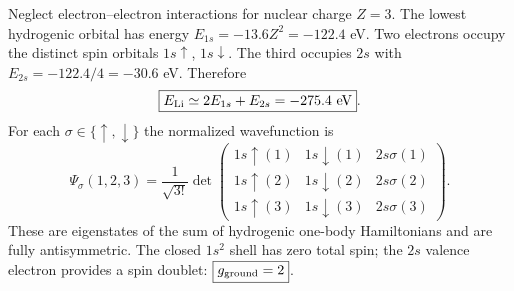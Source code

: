 Neglect electron--electron interactions
for nuclear charge $Z=3$. The lowest
hydrogenic orbital has energy
$E_{1s}=-13.6Z^2=-122.4$ eV.
Two electrons occupy the distinct spin
orbitals $1s\uparrow$, $1s\downarrow$.
The third occupies $2s$ with
$E_{2s}=-122.4/4=-30.6$ eV.
Therefore
\begin{equation}
\boxed{E_{\rm Li}\simeq
2E_{1s}+E_{2s}=-275.4\ {\rm eV}}.
\end{equation}
For each $\sigma\in\{\uparrow,\downarrow\}$
the normalized wavefunction is
\begin{equation}
\boxed{
\Psi_{\sigma}(1,2,3)=
\frac1{\sqrt{3!}}\det
\begin{pmatrix}
1s\uparrow(1)&1s\downarrow(1)&2s\sigma(1)\\
1s\uparrow(2)&1s\downarrow(2)&2s\sigma(2)\\
1s\uparrow(3)&1s\downarrow(3)&2s\sigma(3)
\end{pmatrix}}.
\end{equation}
These are eigenstates of the sum of
hydrogenic one-body Hamiltonians and
are fully antisymmetric. The closed
$1s^2$ shell has zero total spin;
the $2s$ valence electron provides
a spin doublet:
$\boxed{g_{\rm ground}=2}$.

